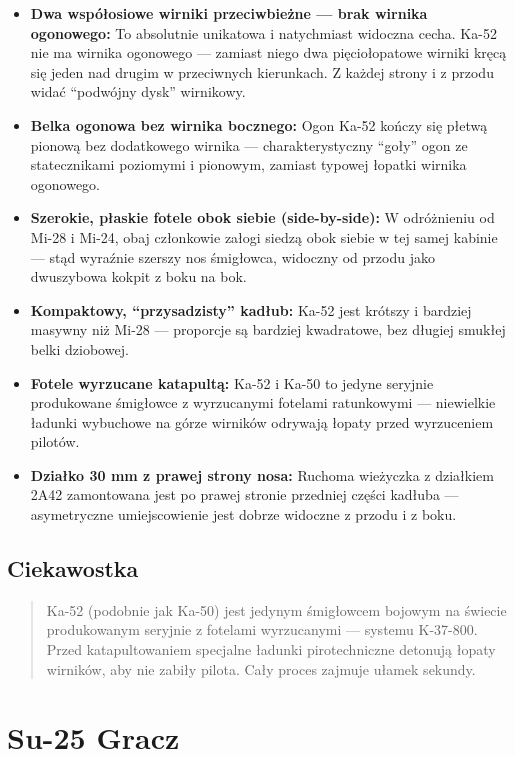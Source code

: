 \documentclass[12pt,oneside]{book}
\providecommand{\tightlist}{%
  \setlength{\itemsep}{0pt}\setlength{\parskip}{0pt}}
\begin{document}
\begin{itemize}
\tightlist
\item
  \textbf{Dwa współosiowe wirniki przeciwbieżne --- brak wirnika
  ogonowego:} To absolutnie unikatowa i natychmiast widoczna cecha.
  Ka-52 nie ma wirnika ogonowego --- zamiast niego dwa pięciołopatowe
  wirniki kręcą się jeden nad drugim w przeciwnych kierunkach. Z każdej
  strony i z przodu widać ``podwójny dysk'' wirnikowy.
\item
  \textbf{Belka ogonowa bez wirnika bocznego:} Ogon Ka-52 kończy się
  płetwą pionową bez dodatkowego wirnika --- charakterystyczny ``goły''
  ogon ze statecznikami poziomymi i pionowym, zamiast typowej łopatki
  wirnika ogonowego.
\item
  \textbf{Szerokie, płaskie fotele obok siebie (side-by-side):} W
  odróżnieniu od Mi-28 i Mi-24, obaj członkowie załogi siedzą obok
  siebie w tej samej kabinie --- stąd wyraźnie szerszy nos śmigłowca,
  widoczny od przodu jako dwuszybowa kokpit z boku na bok.
\item
  \textbf{Kompaktowy, ``przysadzisty'' kadłub:} Ka-52 jest krótszy i
  bardziej masywny niż Mi-28 --- proporcje są bardziej kwadratowe, bez
  długiej smukłej belki dziobowej.
\item
  \textbf{Fotele wyrzucane katapultą:} Ka-52 i Ka-50 to jedyne seryjnie
  produkowane śmigłowce z wyrzucanymi fotelami ratunkowymi ---
  niewielkie ładunki wybuchowe na górze wirników odrywają łopaty przed
  wyrzuceniem pilotów.
\item
  \textbf{Działko 30 mm z prawej strony nosa:} Ruchoma wieżyczka z
  działkiem 2A42 zamontowana jest po prawej stronie przedniej części
  kadłuba --- asymetryczne umiejscowienie jest dobrze widoczne z przodu
  i z boku.
\end{itemize}

\subsection{Ciekawostka}\label{ciekawostka-56}

\begin{quote}
Ka-52 (podobnie jak Ka-50) jest jedynym śmigłowcem bojowym na świecie
produkowanym seryjnie z fotelami wyrzucanymi --- systemu K-37-800. Przed
katapultowaniem specjalne ładunki pirotechniczne detonują łopaty
wirników, aby nie zabiły pilota. Cały proces zajmuje ułamek sekundy.
\end{quote}

\section{Su-25 Gracz}\label{su-25-gracz}
\end{document}
